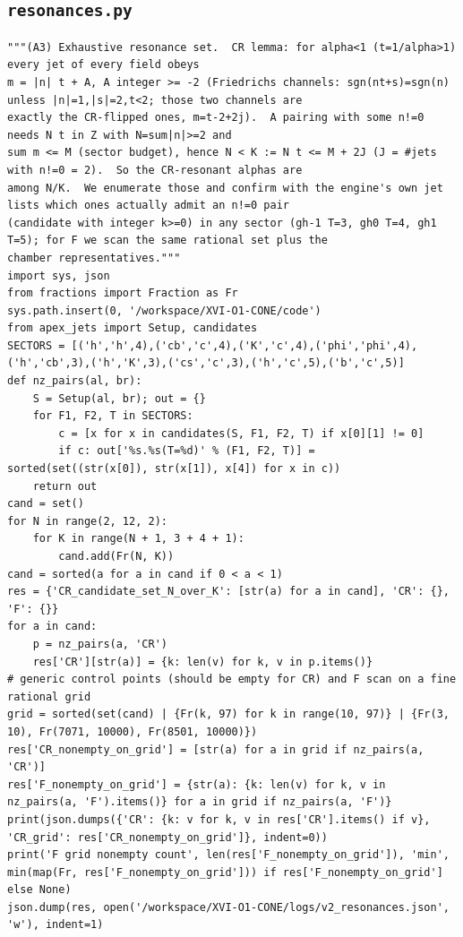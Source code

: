 \documentclass[10pt]{article}
\begin{document}
\subsection{\texttt{resonances.py}}
\begin{lstlisting}
"""(A3) Exhaustive resonance set.  CR lemma: for alpha<1 (t=1/alpha>1) every jet of every field obeys
m = |n| t + A, A integer >= -2 (Friedrichs channels: sgn(nt+s)=sgn(n) unless |n|=1,|s|=2,t<2; those two channels are
exactly the CR-flipped ones, m=t-2+2j).  A pairing with some n!=0 needs N t in Z with N=sum|n|>=2 and
sum m <= M (sector budget), hence N < K := N t <= M + 2J (J = #jets with n!=0 = 2).  So the CR-resonant alphas are
among N/K.  We enumerate those and confirm with the engine's own jet lists which ones actually admit an n!=0 pair
(candidate with integer k>=0) in any sector (gh-1 T=3, gh0 T=4, gh1 T=5); for F we scan the same rational set plus the
chamber representatives."""
import sys, json
from fractions import Fraction as Fr
sys.path.insert(0, '/workspace/XVI-O1-CONE/code')
from apex_jets import Setup, candidates
SECTORS = [('h','h',4),('cb','c',4),('K','c',4),('phi','phi',4),('h','cb',3),('h','K',3),('cs','c',3),('h','c',5),('b','c',5)]
def nz_pairs(al, br):
    S = Setup(al, br); out = {}
    for F1, F2, T in SECTORS:
        c = [x for x in candidates(S, F1, F2, T) if x[0][1] != 0]
        if c: out['%s.%s(T=%d)' % (F1, F2, T)] = sorted(set((str(x[0]), str(x[1]), x[4]) for x in c))
    return out
cand = set()
for N in range(2, 12, 2):
    for K in range(N + 1, 3 + 4 + 1):
        cand.add(Fr(N, K))
cand = sorted(a for a in cand if 0 < a < 1)
res = {'CR_candidate_set_N_over_K': [str(a) for a in cand], 'CR': {}, 'F': {}}
for a in cand:
    p = nz_pairs(a, 'CR')
    res['CR'][str(a)] = {k: len(v) for k, v in p.items()}
# generic control points (should be empty for CR) and F scan on a fine rational grid
grid = sorted(set(cand) | {Fr(k, 97) for k in range(10, 97)} | {Fr(3, 10), Fr(7071, 10000), Fr(8501, 10000)})
res['CR_nonempty_on_grid'] = [str(a) for a in grid if nz_pairs(a, 'CR')]
res['F_nonempty_on_grid'] = {str(a): {k: len(v) for k, v in nz_pairs(a, 'F').items()} for a in grid if nz_pairs(a, 'F')}
print(json.dumps({'CR': {k: v for k, v in res['CR'].items() if v}, 'CR_grid': res['CR_nonempty_on_grid']}, indent=0))
print('F grid nonempty count', len(res['F_nonempty_on_grid']), 'min', min(map(Fr, res['F_nonempty_on_grid'])) if res['F_nonempty_on_grid'] else None)
json.dump(res, open('/workspace/XVI-O1-CONE/logs/v2_resonances.json', 'w'), indent=1)
\end{lstlisting}
\end{document}
